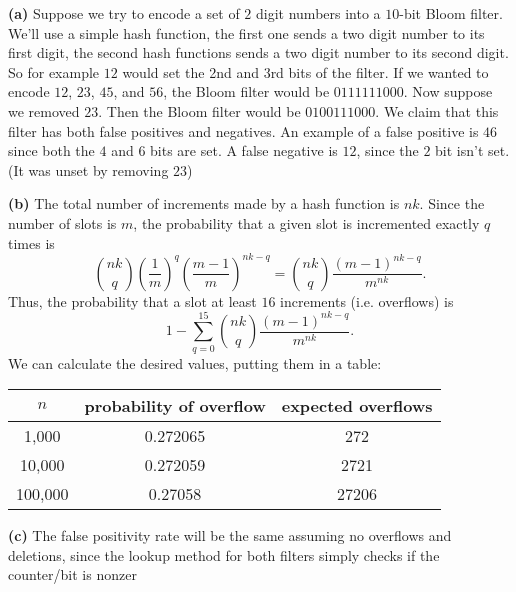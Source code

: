 \documentclass[11pt,letterpaper]{article}
\begin{document}
\begin{solution}
    \textbf{(a)} Suppose we try to encode a set of $2$ digit numbers into a $10$-bit Bloom filter. We'll use a simple hash function, the first one sends a two digit number to its first digit, the second hash functions sends a two digit number to its second digit. So for example $12$ would set the 2nd and 3rd bits of the filter. If we wanted to encode $12$, $23$, $45$, and $56$, the Bloom filter would be $0111111000$. Now suppose we removed $23$. Then the Bloom filter would be $0100111000$. We claim that this filter has both false positives and negatives. An example of a false positive is $46$ since both the $4$ and $6$ bits are set. A false negative is $12$, since the $2$ bit isn't set. (It was unset by removing $23$)
    
    \textbf{(b)} The total number of increments made by a hash function is $nk$. Since the number of slots is $m$, the probability that a given slot is incremented exactly $q$ times is
    \[
        \binom{nk}{q}\left(\frac{1}{m}\right)^q\left(\frac{m-1}{m}\right)^{nk-q} = \binom{nk}{q}\frac{(m-1)^{nk-q}}{m^{nk}}
    .\] 
    Thus, the probability that a slot at least $16$ increments (i.e. overflows) is
    \[
        1-\sum^{15}_{q=0}\binom{nk}{q}\frac{(m-1)^{nk-q}}{m^{nk}}
    .\] 
    We can calculate the desired values, putting them in a table:
    \begin{table}[htpb]
        \centering
        \begin{tabular}{|c|c|c|}
        \hline
        $n$ & probability of overflow & expected overflows\\
        \hline
        1,000 & 0.272065 & 272\\
        \hline
        10,000 & 0.272059& 2721\\
        \hline
        100,000 & 0.27058& 27206\\
        \hline
        \end{tabular}
    \end{table}
    
    \textbf{(c)} The false positivity rate will be the same assuming no overflows and deletions, since the lookup method for both filters simply checks if the counter/bit is nonzer
\end{solution}
\end{document}
